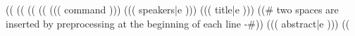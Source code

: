 

((%
((%
\noindent{}
\workshopspace((%
((%
\noindent((( command ))){%
  ((( speakers|e )))%
}{%
  ((( title|e )))%
}{%
}{%
((# two spaces are inserted by preprocessing at the beginning of each line -#))
((( abstract|e )))%
}
((%



